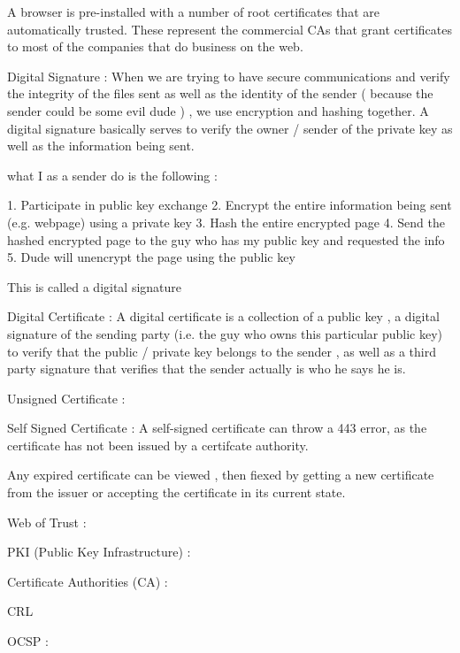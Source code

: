 A browser is pre-installed with a number of root certificates that are
automatically trusted. These represent the commercial CAs that grant
certificates to most of the companies that do business on the web. 

Digital Signature : When we are trying to have secure communications and verify
the integrity of the files sent as well as the identity of the sender ( because
the sender could be some evil dude ) , we use encryption and hashing together. A
digital signature basically serves to verify the owner / sender of the private
key as well as the information being sent.


what I as a sender do is the following :

1. Participate in public key exchange
2. Encrypt the entire information being sent (e.g. webpage) using a private key
3. Hash the entire encrypted page
4. Send the hashed encrypted page to the guy who has my public key and requested
the info
5. Dude will unencrypt the page using the public key

This is called a digital signature

Digital Certificate : A digital certificate is a collection of a public key , a
digital signature of the sending party (i.e. the guy who owns this particular
public key) to verify that the public / private key belongs to the sender , as
well as a third party signature that verifies that the sender actually is who he
says he is.

Unsigned Certificate :

Self Signed Certificate : A self-signed certificate can throw a 443 error, as
the certificate has not been issued by a certifcate authority.

Any expired certificate can be viewed , then fiexed by getting a new certificate
from the issuer or accepting the certificate in its current state.


Web of Trust :

PKI (Public Key Infrastructure) : 

Certificate Authorities (CA) :

CRL

OCSP : 


\subsubsectionend


\subsectionend








